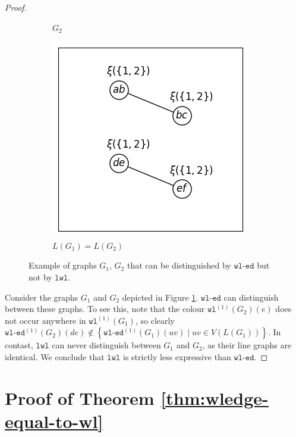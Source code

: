 \documentclass{article}
\newcommand{\set}[1]{\left\{#1\right\}}
\newcommand{\iter}[1]{^{(#1)}}
\newcommand{\wl}{\texttt{wl}}
\newcommand{\wledge}{\texttt{wl-ed}}
\newcommand{\lwl}{\texttt{lwl}}
\begin{document}
\begin{proof}
\begin{figure}[ht]
\begin{subfigure}[b]{0.25\textwidth}
            \caption{$G_2$}
        \end{subfigure}
        \begin{subfigure}[b]{0.25\textwidth}
            \includegraphics[width=\textwidth]{figures/lwl vs wl-ed/L(G1)-L(G2).png}
            \caption{$L(G_1)=L(G_2)$}
        \end{subfigure}
        \caption{Example of graphs $G_1$, $G_2$ that can be distinguished by $\wledge$ but not by $\lwl$.}
        \label{fig:lwl-wledge-counterexample}
    \end{figure}

    Consider the graphs $G_1$ and $G_2$ depicted in Figure \ref{fig:lwl-wledge-counterexample}.
    $\wledge$ can distinguish between these graphs. To see this, note that the colour $\wl\iter{1}(G_2)(e)$ does not occur anywhere in $\wl\iter{1}(G_1)$, so clearly $\wledge\iter{1}(G_2)(de) \notin \set{\wledge\iter{1}(G_1)(uv) \mid uv\in V(L(G_1))}$.
    In contast, $\lwl$ can never distinguish between $G_1$ and $G_2$, as their line graphs are identical. We conclude that $\lwl$ is strictly less expressive than $\wledge$.
\end{proof}


\section{Proof of Theorem \ref{thm:wledge-equal-to-wl}}   \label{app:proof-wledge-equal-to-wl}
\end{document}
